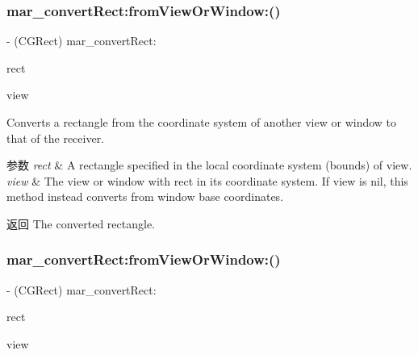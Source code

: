 \mbox{\label{category_u_i_view_07_m_a_r_e_x_08_a136889558c7a94e86577eb7880e5db5b}} 
\subsubsection{\texorpdfstring{mar\+\_\+convert\+Rect\+:from\+View\+Or\+Window\+:()}{mar\_convertRect:fromViewOrWindow:()}\hspace{0.1cm}{\footnotesize\ttfamily [1/2]}}
{\footnotesize\ttfamily -\/ (C\+G\+Rect) mar\+\_\+convert\+Rect\+: \begin{DoxyParamCaption}\item[{(C\+G\+Rect)}]{rect }\item[{fromViewOrWindow:(nullable U\+I\+View $\ast$)}]{view }\end{DoxyParamCaption}}

Converts a rectangle from the coordinate system of another view or window to that of the receiver.


\begin{DoxyParams}{参数}
{\em rect} & A rectangle specified in the local coordinate system (bounds) of view. \\
\hline
{\em view} & The view or window with rect in its coordinate system. If view is nil, this method instead converts from window base coordinates. \\
\hline
\end{DoxyParams}
\begin{DoxyReturn}{返回}
The converted rectangle. 
\end{DoxyReturn}
\mbox{\label{category_u_i_view_07_m_a_r_e_x_08_a4136ba3c8681ad64d678ea5976348d50}} 
\subsubsection{\texorpdfstring{mar\+\_\+convert\+Rect\+:from\+View\+Or\+Window\+:()}{mar\_convertRect:fromViewOrWindow:()}\hspace{0.1cm}{\footnotesize\ttfamily [2/2]}}
{\footnotesize\ttfamily -\/ (C\+G\+Rect) mar\+\_\+convert\+Rect\+: \begin{DoxyParamCaption}\item[{(C\+G\+Rect)}]{rect }\item[{fromViewOrWindow:(U\+I\+View $\ast$)}]{view }\end{DoxyParamCaption}\hspace{0.3cm}{\ttfamily [implementation]}}

